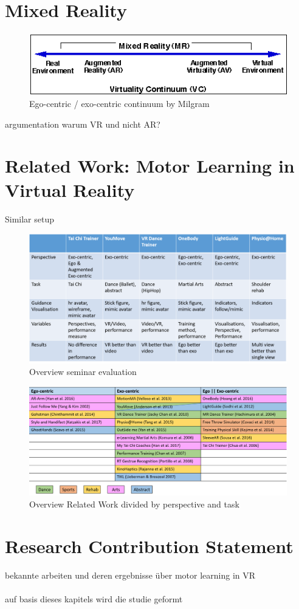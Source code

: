 \section{Mixed Reality}
\label{section:mixed_reality}
\begin{figure}[htb]
	\centering
	\includegraphics[width=\textwidth]{figures/milgram_continuum.png}
	\caption[Ego-Exo continuum by Milgram]{Ego-centric / exo-centric continuum by Milgram }
	\label{fig:mr_continuum}
\end{figure}


argumentation warum VR und nicht AR?
\section{Related Work: Motor Learning in Virtual Reality}
Similar setup~\cite{samesetup}
\label{section:related_work}
\begin{figure}[htb]
	\centering
	\includegraphics[width=\textwidth]{figures/detail_paper_overview.png}
	\caption[Overview seminar evaluation]{Overview seminar evaluation}
	\label{fig:rw_overview_detail}
\end{figure}

\begin{figure}[htb]
	\centering
	\includegraphics[width=\textwidth]{figures/rw_overview.png}
	\caption[Overview seminar evaluation]{Overview Related Work divided by perspective and task}
	\label{fig:rw_overview}
\end{figure}
\section{Research Contribution Statement}
\label{delimination_contribution}
bekannte arbeiten und deren ergebnisse über motor learning in VR\\
\\
auf basis dieses kapitels wird die studie geformt

